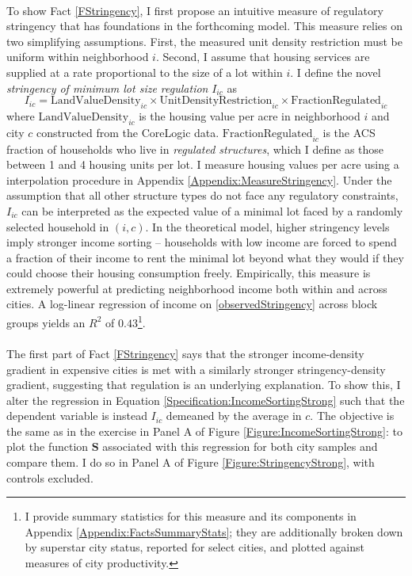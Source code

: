 \documentclass[12pt]{article}
\begin{document}
	\paragraph*{} 
	To show Fact \ref{FStringency}, I first propose an intuitive measure of regulatory stringency that has foundations in the forthcoming model. This measure relies on two simplifying assumptions. First, the measured unit density restriction must be uniform within neighborhood $i$. Second, I assume that housing services are supplied at a rate proportional to the size of a lot within $i$. I define the novel \textit{stringency of minimum lot size regulation} $I_{ic}$ as
	\begin{equation}\label{observedStringency}
		I_{ic} = \text{LandValueDensity}_{ic} \times \text{UnitDensityRestriction}_{ic} \times \text{FractionRegulated}_{ic}
	\end{equation}
	where $\text{LandValueDensity}_{ic}$ is the housing value per acre in neighborhood $i$ and city $c$ constructed from the CoreLogic data. $\text{FractionRegulated}_{ic}$ is the ACS fraction of households who live in \textit{regulated structures}, which I define as those between 1 and 4 housing units per lot. I measure housing values per acre using a interpolation procedure in Appendix \ref{Appendix:MeasureStringency}. Under the assumption that all other structure types do not face any regulatory constraints, $I_{ic}$ can be interpreted as the expected value of a minimal lot faced by a randomly selected household in $(i, c)$. In the theoretical model, higher stringency levels imply stronger income sorting -- households with low income are forced to spend a fraction of their income to rent the minimal lot beyond what they would if they could choose their housing consumption freely. Empirically, this measure is extremely powerful at predicting neighborhood income both within and across cities. A log-linear regression of income on \eqref{observedStringency} across block groups yields an $R^{2}$ of $0.43$\footnote {I provide summary statistics for this measure and its components in Appendix \ref{Appendix:FactsSummaryStats}; they are additionally broken down by superstar city status, reported for select cities, and plotted against measures of city productivity.}.
	
	\paragraph*{}
	The first part of Fact \ref{FStringency} says that the stronger income-density gradient in expensive cities is met with a similarly stronger stringency-density gradient, suggesting that regulation is an underlying explanation. To show this, I alter the regression in Equation \eqref{Specification:IncomeSortingStrong} such that the dependent variable is instead $I_{ic}$ demeaned by the average in $c$. The objective is the same as in the exercise in Panel A of Figure \ref{Figure:IncomeSortingStrong}: to plot the function $\mathbf{S}$ associated with this regression for both city samples and compare them. I do so in Panel A of Figure \ref{Figure:StringencyStrong}, with controls excluded. 
	
\end{document}
